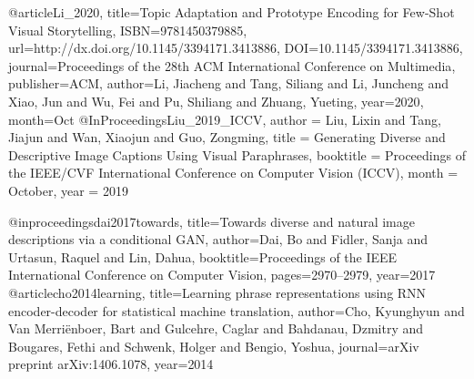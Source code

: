 @article{Li_2020,
   title={Topic Adaptation and Prototype Encoding for Few-Shot Visual Storytelling},
   ISBN={9781450379885},
   url={http://dx.doi.org/10.1145/3394171.3413886},
   DOI={10.1145/3394171.3413886},
   journal={Proceedings of the 28th ACM International Conference on Multimedia},
   publisher={ACM},
   author={Li, Jiacheng and Tang, Siliang and Li, Juncheng and Xiao, Jun and Wu, Fei and Pu, Shiliang and Zhuang, Yueting},
   year={2020},
   month={Oct}
}
@InProceedings{Liu_2019_ICCV,
author = {Liu, Lixin and Tang, Jiajun and Wan, Xiaojun and Guo, Zongming},
title = {Generating Diverse and Descriptive Image Captions Using Visual Paraphrases},
booktitle = {Proceedings of the IEEE/CVF International Conference on Computer Vision (ICCV)},
month = {October},
year = {2019}
}

@inproceedings{dai2017towards,
  title={Towards diverse and natural image descriptions via a conditional {GAN}},
  author={Dai, Bo and Fidler, Sanja and Urtasun, Raquel and Lin, Dahua},
  booktitle={Proceedings of the IEEE International Conference on Computer Vision},
  pages={2970--2979},
  year={2017}
}
@article{cho2014learning,
  title={Learning phrase representations using {RNN} encoder-decoder for statistical machine translation},
  author={Cho, Kyunghyun and Van Merri{\"e}nboer, Bart and Gulcehre, Caglar and Bahdanau, Dzmitry and Bougares, Fethi and Schwenk, Holger and Bengio, Yoshua},
  journal={arXiv preprint arXiv:1406.1078},
  year={2014}
}

